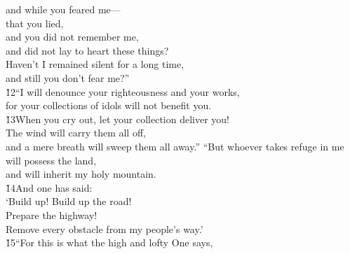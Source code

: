 \begin{poetry}
\poemll    and while you feared me--- \\
\poeml that you lied, \\
\poemll    and you did not remember me, \\
\poemlll       and did not lay to heart these things? \\
\poeml Haven't I remained silent for a long time, \\
\poemll    and still you don't fear me?'' \\
\poeml \v{12}``I will denounce your righteousness and your works, \\
\poemll    for your collections of idols will not benefit you. \\
\poeml \v{13}When you cry out, let your collection deliver you! \\
\poemll    The wind will carry them all off, \\
\poemlll       and a mere breath will sweep them all away.''
\poeml ``But whoever takes refuge in me will possess the land, \\
\poemll    and will inherit my holy mountain. \\
\poeml \v{14}And one has said: \\
\poemll    `Build up! Build up the road! \\
\poemlll       Prepare the highway! \\
\poeml Remove every obstacle from my people's way.' \\
\poeml \v{15}``For this is what the high and lofty One says, \\

\end{poetry}
